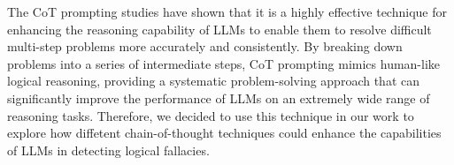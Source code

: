 \par
The CoT prompting studies have shown that it is a highly effective technique for enhancing the reasoning capability of LLMs to enable them to resolve difficult multi-step problems more accurately and consistently. By breaking down problems into a series of intermediate steps, CoT prompting mimics human-like logical reasoning, providing a systematic problem-solving approach that can significantly improve the performance of LLMs on an extremely wide range of reasoning tasks. Therefore, we decided to use this technique in our work to explore how diffetent chain-of-thought techniques could enhance the capabilities of LLMs in detecting logical fallacies.